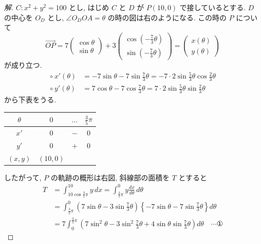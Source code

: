 \documentclass[../main.tex]{subfiles}
\begin{document}
\begin{proof}[解]
  $C: x^2 + y^2 = 100$ とし, はじめ $C$ と $D$ が $P(10, 0)$ で接しているとする. $D$ の中心を $O_D$ とし, $\angle O_D O A = \theta$ の時の図は右のようになる. この時の $P$ について
  \[
    \vec{OP} = 7
    \begin{pmatrix} \cos\theta \\ \sin\theta
    \end{pmatrix} + 3
    \begin{pmatrix} \cos(-\frac{7}{3}\theta) \\ \sin(-\frac{7}{3}\theta)
    \end{pmatrix} =
    \begin{pmatrix} x(\theta) \\ y(\theta)
    \end{pmatrix}
  \]
  が成り立つ.
  \begin{align*}
    \circ \ x'(\theta) &= -7\sin\theta - 7\sin\frac{7}{3}\theta = -7 \cdot 2 \sin\frac{5}{3}\theta \cos\frac{2}{3}\theta \\
    \circ \ y'(\theta) &= 7\cos\theta - 7\cos\frac{7}{3}\theta = 7 \cdot 2 \sin\frac{5}{3}\theta \sin\frac{2}{3}\theta
  \end{align*}
  から下表をうる.

  \begin{center}
    \begin{tabular}{|c|ccc|}
      \hline
      $\theta$ & $0$ & $\dots$ & $\frac{3}{5}\pi$ \\ \hline
      $x'$ & $0$ & $-$ & $0$ \\ \hline
      $y'$ & $0$ & $+$ & $0$ \\ \hline
      $(x, y)$ & $(10, 0)$ & & \\ \hline
    \end{tabular}
  \end{center}

  したがって, $P$ の軌跡の概形は右図, 斜線部の面積を $T$ とすると
  \begin{align*}
    T &= \int_{10\cos\frac{3}{5}\pi}^{10} y \, dx = \int_{\frac{3}{5}\pi}^0 y \frac{dx}{d\theta} \, d\theta \\
    &= \int_{\frac{3}{5}\pi}^0 \left( 7\sin\theta - 3\sin\frac{7}{3}\theta \right) \left\{ -7\sin\theta - 7\sin\frac{7}{3}\theta \right\} d\theta \\
    &= 7 \int_0^{\frac{3}{5}\pi} \left( 7\sin^2\theta - 3\sin^2\frac{7}{3}\theta + 4\sin\theta\sin\frac{7}{3}\theta \right) d\theta \quad \cdots ①
  \end{align*}


\end{proof}
\end{document}
